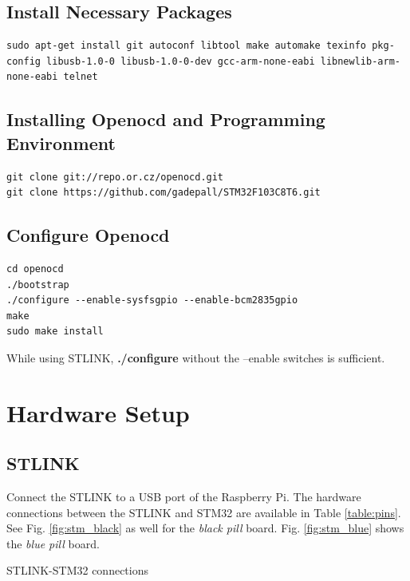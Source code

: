 \documentclass[journal,12pt,twocolumn]{IEEEtran}
\begin{document}
\subsection{ Install Necessary Packages}
\begin{lstlisting}
sudo apt-get install git autoconf libtool make automake texinfo pkg-config libusb-1.0-0 libusb-1.0-0-dev gcc-arm-none-eabi libnewlib-arm-none-eabi telnet
\end{lstlisting}

\subsection{Installing Openocd and Programming Environment}
\begin{lstlisting}
git clone git://repo.or.cz/openocd.git
git clone https://github.com/gadepall/STM32F103C8T6.git
\end{lstlisting}
\subsection{Configure Openocd}
\begin{lstlisting}
cd openocd
./bootstrap 
./configure --enable-sysfsgpio --enable-bcm2835gpio
make
sudo make install
\end{lstlisting}
%
While using STLINK, \textbf{./configure} without the --enable switches is sufficient.
\section{Hardware Setup}
\subsection{STLINK}
Connect the STLINK to a USB port of the Raspberry Pi.  The hardware connections between the STLINK and STM32 are available in Table \ref{table:pins}. See Fig. \ref{fig:stm_black} as well for the {\em black pill}  board.  Fig. \ref{fig:stm_blue} shows the {\em blue pill} board.
\begin{table}[!h]
\centering

\caption{STLINK-STM32 connections}
\label{table:pins}
\end{table}
\end{document}
